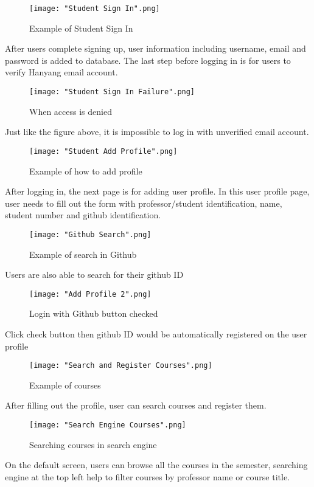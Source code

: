 \documentclass[10pt,journal,compsoc]{IEEEtran}
\begin{document}
\begin{figure}[H]
\centering
\texttt{[image: "Student Sign In".png]}
{\caption*{Example of Student Sign In}}
\end{figure}
After users complete signing up, user information including username, email and password is added to database. The last step before logging in is for users to verify Hanyang email account.

\begin{figure}[H]
\centering
\texttt{[image: "Student Sign In Failure".png]}
{\caption*{When access is denied}}
\end{figure}
Just like the figure above, it is impossible to log in with unverified email account. 

\begin{figure}[H]
\centering
\texttt{[image: "Student Add Profile".png]}
{\caption*{Example of how to add profile}}
\end{figure}
After logging in, the next page is for adding user profile. In this user profile page, user needs to fill out the form with professor/student identification, name, student number and github identification. 

\begin{figure}[H]
\centering
\texttt{[image: "Github Search".png]}
{\caption*{Example of search in Github}}
\end{figure}
Users are also able to search for their github ID


\begin{figure}[H]
\centering
\texttt{[image: "Add Profile 2".png]}
{\caption*{Login with Github button checked}}
\end{figure}
Click check button then github ID would be automatically registered on the user profile

\begin{figure}[H]
\centering
\texttt{[image: "Search and Register Courses".png]}
{\caption*{Example of courses}}
\end{figure}
After filling out the profile, user can search courses and register them.

\begin{figure}[H]
\centering
\texttt{[image: "Search Engine Courses".png]}
{\caption*{Searching courses in search engine}}
\end{figure}

On the default screen, users can browse all the courses in the semester, searching engine at the top left help to filter courses by professor name or course title. 
\end{document}
